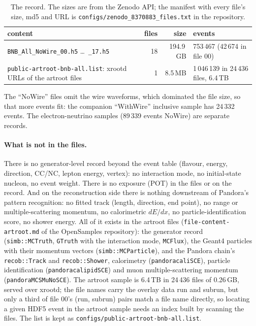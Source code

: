 \documentclass[10pt,letterpaper]{article}
\newcommand{\code}[1]{\texttt{#1}}
\begin{document}
\begin{table}[H]\centering\small
\caption{The record. The sizes are from the Zenodo API; the manifest with every file's size, md5 and URL is
\code{configs/zenodo\_8370883\_files.txt} in the repository.}\label{tab:record}
\begin{tabular}{@{}p{70mm}rrp{45mm}@{}}\toprule
content & files & size & events\\ \midrule
\code{BNB\_All\_NoWire\_00.h5} \ldots\ \code{\_17.h5} & 18 & 194.9\,GB & 753\,467 (42\,674 in file 00)\\
\code{public-artroot-bnb-all.list}: xrootd URLs of the artroot files & 1 & 8.5\,MB & 1\,046\,139 in 24\,436 files, 6.4\,TB\\
\bottomrule\end{tabular}
\end{table}

The ``NoWire'' files omit the wire waveforms, which dominated the file size, so that more events fit: the companion
``WithWire'' inclusive sample has 24\,332 events. The electron-neutrino samples (89\,339 events NoWire) are separate
records.

\paragraph{What is not in the files.} There is no generator-level record beyond the event table (flavour, energy,
direction, CC/NC, lepton energy, vertex): no interaction mode, no initial-state nucleon, no event weight. There is no
exposure (POT) in the files or on the record. And on the reconstruction side there is nothing downstream of Pandora's
pattern recognition: no fitted track (length, direction, end point), no range or multiple-scattering momentum, no
calorimetric $dE/dx$, no particle-identification score, no shower energy. All of it exists in the artroot files
(\code{file-content-artroot.md} of the OpenSamples repository): the generator record (\code{simb::MCTruth},
\code{GTruth} with the interaction mode, \code{MCFlux}), the Geant4 particles with their momentum vectors
(\code{simb::MCParticle}), and the Pandora chain's \code{recob::Track} and \code{recob::Shower}, calorimetry
(\code{pandoracaliSCE}), particle identification (\code{pandoracalipidSCE}) and muon multiple-scattering momentum
(\code{pandoraMCSMuNoSCE}). The artroot sample is 6.4\,TB in 24\,436 files of 0.26\,GB, served over xrootd; the
file names carry the overlay data run and subrun, but only a third of file 00's (run, subrun) pairs match a file name
directly, so locating a given HDF5 event in the artroot sample needs an index built by scanning the files. The list
is kept as \code{configs/public-artroot-bnb-all.list}.
\end{document}
